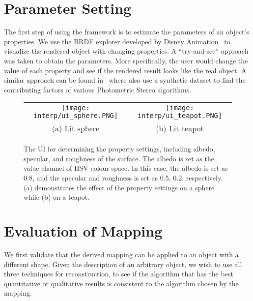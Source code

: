 
\section{Parameter Setting}
The first step of using the framework is to estimate the parameters of an object's properties. We use the BRDF explorer developed by Disney Animation~\cite{disnybrdf} to visualize the rendered object with changing properties. A ``try-and-see'' approach was taken to obtain the parameters. More specifically, the user would change the value of each property and see if the rendered result looks like the real object. A similar approach can be found in~\cite{Berkiten:2016:ARB} where \citeauthor{Berkiten:2016:ARB} also use a synthetic dataset to find the contributing factors of various Photometric Stereo algorithms.
\begin{figure}[!htbp]
\centering
\begin{tabular}{cc}
  \texttt{[image: interp/ui\_sphere.PNG]}&
  \texttt{[image: interp/ui\_teapot.PNG]}\\
  (a) Lit sphere & (b) Lit teapot\\
\end{tabular}
\caption{The UI for determining the property settings, including albedo, specular, and roughness of the surface. The albedo is set as the value channel of HSV colour space. In this case, the albedo is set as 0.8, and the specular and roughness is set as 0.5, 0.2, respectively. (a) demonstrates the effect of the property settings on a sphere while (b) on a teapot.}
\label{fig:ui}
\end{figure}

\section{Evaluation of Mapping}
\label{sec:eval_mapping}
We first validate that the derived mapping can be applied to an object with a different shape. Given the description of an arbitrary object, we wish to use all three techniques for reconstruction, to see if the algorithm that has the best quantitative or qualitative results is consistent to the algorithm chosen by the mapping.

